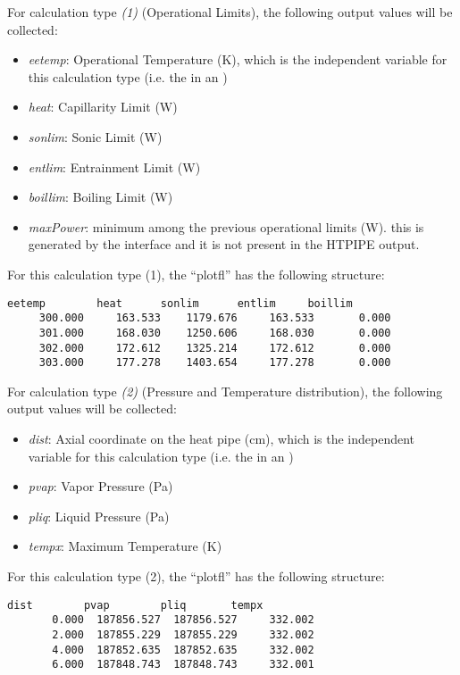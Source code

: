 For calculation type  \textit{(1)} (Operational Limits), the following output values will be collected:
\begin{itemize}
  \item \textit{eetemp}: Operational Temperature (K), which is the independent variable for this calculation type (i.e. the  in an )
  \item \textit{heat}: Capillarity Limit (W) 
  \item \textit{sonlim}: Sonic Limit (W)
  \item \textit{entlim}: Entrainment Limit (W)
  \item \textit{boillim}: Boiling Limit (W)
   \item \textit{maxPower}: minimum among the previous operational limits (W). \nb this is generated by the interface and it is not present in the HTPIPE output.
\end{itemize}

For this calculation type (1), the ``plotfl'' has the following structure:
  \begin{lstlisting}[basicstyle=\tiny]
      eetemp        heat      sonlim      entlim     boillim
     300.000     163.533    1179.676     163.533       0.000
     301.000     168.030    1250.606     168.030       0.000
     302.000     172.612    1325.214     172.612       0.000
     303.000     177.278    1403.654     177.278       0.000
\end{lstlisting}

For calculation type  \textit{(2)} (Pressure and Temperature distribution), the following output values will be collected:
\begin{itemize}
  \item \textit{dist}: Axial coordinate on the heat pipe (cm), which is the independent variable for this calculation type (i.e. the  in an )
  \item \textit{pvap}: Vapor Pressure (Pa) 
  \item \textit{pliq}: Liquid Pressure (Pa)
  \item \textit{tempx}: Maximum Temperature (K)
\end{itemize}

For this calculation type (2), the ``plotfl'' has the following structure:
  \begin{lstlisting}[basicstyle=\tiny]
        dist        pvap        pliq       tempx
       0.000  187856.527  187856.527     332.002
       2.000  187855.229  187855.229     332.002
       4.000  187852.635  187852.635     332.002
       6.000  187848.743  187848.743     332.001
\end{lstlisting}


